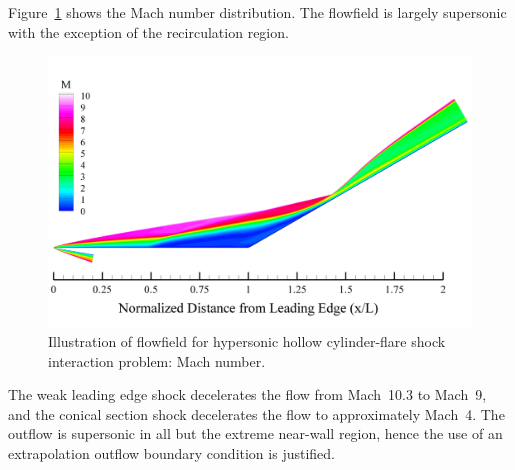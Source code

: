 \clearpage
Figure~\ref{fig:holden_hollow_cylinder_global_M} shows the Mach number distribution. The flowfield is largely supersonic with the exception of the recirculation region.
\begin{figure}[hbtp]
  \begin{center}
    \includegraphics[width=\textwidth]{figures/holden_hollow_cylinder/M}
    \caption{Illustration of flowfield for hypersonic hollow cylinder-flare shock interaction problem: Mach number.\label{fig:holden_hollow_cylinder_global_M}}
  \end{center}
\end{figure}
 The weak leading edge shock decelerates the flow from Mach~10.3 to Mach~9, and the conical section shock decelerates the flow to approximately Mach~4.  The outflow is supersonic in all but the extreme near-wall region, hence the use of an extrapolation outflow boundary condition is justified.

